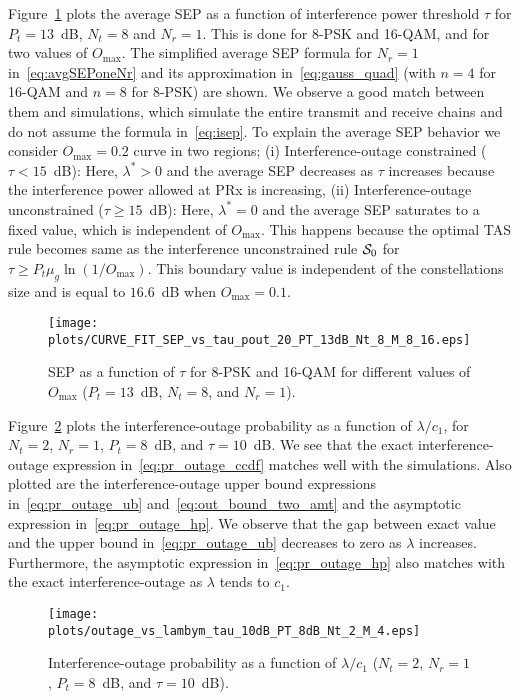 \documentclass[12pt,draftcls,peerreview,onecolumn]{IEEEtran}
\newcommand{\lam}{\lambda}
\newcommand{\lamstar}{\lam^{*}}
\newcommand{\mug}{{\mu_{g}}}
\newcommand{\Nt}{{N_t}}
\newcommand{\Nr}{{N_r}}
\newcommand{\Pt}{{P_t}}
\newcommand{\outmax}{O_{\text{max}}}
\newcommand{\itau}{\tau}
\newcommand{\cone}{c_{1}}
\newcommand{\m}{\cone}
\newcommand{\caluncons}{{\cal S_{\text{0}}}}
\begin{document}
Figure~\ref{fig:SEP_vs_tau_QAM} plots the average SEP as a function of interference power threshold $\tau$ for $\Pt = 13$~dB, $\Nt=8$ and $\Nr=1$. This is done for 8-PSK and 16-QAM, and for two values of $\outmax$. The simplified average SEP formula for $\Nr=1$ in~\eqref{eq:avgSEPoneNr} and its approximation in~\eqref{eq:gauss_quad} (with $n = 4$ for 16-QAM and $n=8$ for 8-PSK)  are shown. We observe a good match between them and simulations, which simulate the entire transmit and receive chains and do not assume the formula in~\eqref{eq:isep}. To explain the average SEP behavior we consider $\outmax=0.2$ curve in two regions; (i) Interference-outage constrained ($\itau < 15$~dB): Here, $\lamstar>0$ and the average SEP decreases as $\itau$ increases because the interference power allowed at PRx is increasing, (ii) Interference-outage unconstrained ($\itau \geq 15$~dB): Here,  $\lamstar=0$ and the average SEP saturates to a fixed value, which is independent of $\outmax$. This happens because the optimal TAS rule becomes same as the interference unconstrained rule $\caluncons$ for $\itau\geq \Pt\mug\ln\left(1/\outmax \right)$. This boundary value is independent of the  constellations size and is equal to $16.6$~dB when $\outmax=0.1$. 

\begin{figure}
	\centering \texttt{[image: plots/CURVE\_FIT\_SEP\_vs\_tau\_pout\_20\_PT\_13dB\_Nt\_8\_M\_8\_16.eps]}
	\caption{SEP as a function of $\itau$ for 8-PSK and 16-QAM for different values of $\outmax$ ($\Pt = 13$~dB, $\Nt=8$, and $\Nr=1$).}
	\label{fig:SEP_vs_tau_QAM}
\end{figure}



Figure~\ref{fig:outage_vs_lambym} plots the interference-outage probability as a function of $\lam/\cone$,  for $\Nt = 2$, $\Nr=1$, $\Pt = 8$~dB, and $\itau = 10$~dB.  We see that the exact interference-outage expression in~\eqref{eq:pr_outage_ccdf} matches well with the simulations. Also plotted are the interference-outage upper bound expressions in~\eqref{eq:pr_outage_ub} and~\eqref{eq:out_bound_two_amt} and the asymptotic expression in~\eqref{eq:pr_outage_hp}. We observe that the gap between exact value and the upper bound in~\eqref{eq:pr_outage_ub} decreases to zero as $\lam$ increases. Furthermore, the asymptotic expression in~\eqref{eq:pr_outage_hp} also matches with the exact interference-outage as $\lam$  tends to $\cone$.

\begin{figure}
  \centering \texttt{[image: plots/outage\_vs\_lambym\_tau\_10dB\_PT\_8dB\_Nt\_2\_M\_4.eps]}
  \caption{Interference-outage probability as a function of $\lam/\m$ ($\Nt = 2$, $\Nr=1$, $\Pt = 8$~dB, and $\itau = 10$~dB).}
\label{fig:outage_vs_lambym}
\end{figure}
\end{document}
